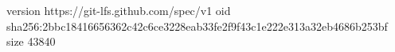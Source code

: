 version https://git-lfs.github.com/spec/v1
oid sha256:2bbc18416656362c42c6ce3228eab33fe2f9f43c1e222e313a32eb4686b253bf
size 43840
